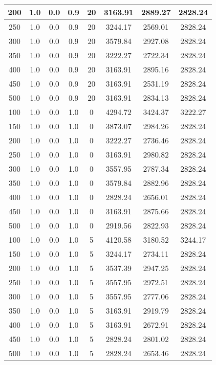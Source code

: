 \documentclass[a4paper, 12pt]{extreport}
\begin{document}
\begin{itemize}
\begin{longtable}{|c|c|c|c|c|c|c|c|}
			200 & 1.0 & 0.0 & 0.9 & 20 & 3163.91 & 2889.27 & 2828.24 \\\hline
			250 & 1.0 & 0.0 & 0.9 & 20 & 3244.17 & 2569.01 & 2828.24 \\\hline
			300 & 1.0 & 0.0 & 0.9 & 20 & 3579.84 & 2927.08 & 2828.24 \\\hline
			350 & 1.0 & 0.0 & 0.9 & 20 & 3222.27 & 2722.34 & 2828.24 \\\hline
			400 & 1.0 & 0.0 & 0.9 & 20 & 3163.91 & 2895.16 & 2828.24 \\\hline
			450 & 1.0 & 0.0 & 0.9 & 20 & 3163.91 & 2531.19 & 2828.24 \\\hline
			500 & 1.0 & 0.0 & 0.9 & 20 & 3163.91 & 2834.13 & 2828.24 \\\hline
			100 & 1.0 & 0.0 & 1.0 & 0 & 4294.72 & 3424.37 & 3222.27 \\\hline
			150 & 1.0 & 0.0 & 1.0 & 0 & 3873.07 & 2984.26 & 2828.24 \\\hline
			200 & 1.0 & 0.0 & 1.0 & 0 & 3222.27 & 2736.46 & 2828.24 \\\hline
			250 & 1.0 & 0.0 & 1.0 & 0 & 3163.91 & 2980.82 & 2828.24 \\\hline
			300 & 1.0 & 0.0 & 1.0 & 0 & 3557.95 & 2787.34 & 2828.24 \\\hline
			350 & 1.0 & 0.0 & 1.0 & 0 & 3579.84 & 2882.96 & 2828.24 \\\hline
			400 & 1.0 & 0.0 & 1.0 & 0 & 2828.24 & 2656.01 & 2828.24 \\\hline
			450 & 1.0 & 0.0 & 1.0 & 0 & 3163.91 & 2875.66 & 2828.24 \\\hline
			500 & 1.0 & 0.0 & 1.0 & 0 & 2919.56 & 2822.93 & 2828.24 \\\hline
			100 & 1.0 & 0.0 & 1.0 & 5 & 4120.58 & 3180.52 & 3244.17 \\\hline
			150 & 1.0 & 0.0 & 1.0 & 5 & 3244.17 & 2734.11 & 2828.24 \\\hline
			200 & 1.0 & 0.0 & 1.0 & 5 & 3537.39 & 2947.25 & 2828.24 \\\hline
			250 & 1.0 & 0.0 & 1.0 & 5 & 3557.95 & 2972.51 & 2828.24 \\\hline
			300 & 1.0 & 0.0 & 1.0 & 5 & 3557.95 & 2777.06 & 2828.24 \\\hline
			350 & 1.0 & 0.0 & 1.0 & 5 & 3163.91 & 2919.79 & 2828.24 \\\hline
			400 & 1.0 & 0.0 & 1.0 & 5 & 3163.91 & 2672.91 & 2828.24 \\\hline
			450 & 1.0 & 0.0 & 1.0 & 5 & 2828.24 & 2801.02 & 2828.24 \\\hline
			500 & 1.0 & 0.0 & 1.0 & 5 & 2828.24 & 2653.46 & 2828.24 \\\hline

\end{longtable}
\end{itemize}
\end{document}
